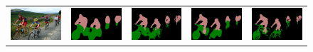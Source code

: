 \begin{figure}[!t]
  \centering
  \scalebox{0.85} {
  \begin{tabular}{c @{\hskip 5pt} c @{\hskip 5pt} c @{\hskip 5pt} c @{\hskip 5pt} c}

    \includegraphics[width=0.21\linewidth]{fig/res_vs_vgg/resnet101_noup_pool3_14/img/2007_001311.jpg} &
    \includegraphics[width=0.21\linewidth]{fig/res_vs_vgg/vgg128_noup_pool3_20M_largewin3_newcode5/res_none/2007_001311.png} &
    \includegraphics[width=0.21\linewidth]{fig/res_vs_vgg/vgg128_noup_pool3_20M_largewin3_newcode5/res_crf/2007_001311.png} &
    \includegraphics[width=0.21\linewidth]{fig/res_vs_vgg/resnet101_noup_pool3_14/res_none/2007_001311.png} &
    \includegraphics[width=0.21\linewidth]{fig/res_vs_vgg/resnet101_noup_pool3_14/res_crf/2007_001311.png} \\


\end{tabular}}
\end{figure}
